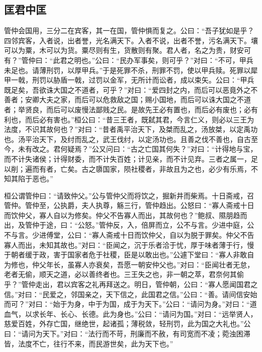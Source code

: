 \documentclass[]{article}
\begin{document}
\hypertarget{header-n335}{%
\subsection{匡君中匡}\label{header-n335}}

管仲会国用，三分二在宾客，其一在国，管仲惧而复之。公曰：``吾子犹如是乎？四邻宾客，入者说，出者誉，光名满天下。入者不说，出者不誉，污名满天下。壤可以为粟，木可以为货。粟尽则有生，货散则有聚。君人者，名之为贵，财安可有？''管仲曰：``此君之明也。''公曰：``民办军事矣，则可乎？''对曰：``不可，甲兵未足也。请薄刑罚，以厚甲兵。''于是死罪不杀，刑罪不罚，使以甲兵赎。死罪以犀甲一戟，刑罚以胁盾一戟，过罚以金军，无所计而讼者，成以束矢。公曰：``甲兵既足矣，吾欲诛大国之不道者，可乎？''对曰：``爱四封之内，而后可以恶竟外之不善者；安卿大夫之家，而后可以危救敌之国；赐小国地，而后可以诛大国之不道者；举贤良，而后可以废慢法鄙贱之民。是故先王必有置也，而后必有废也；必有利也，而后必有害也。''桓公曰：``昔三王者，既弑其君，今言仁义，则必以三王为法度，不识其故何也？''对曰：``昔者禹平治天下，及桀而乱之，汤放桀，以定禹功也。汤平治天下，及纣而乱之，武王伐纣，以定汤功也。且善之伐不善也，自古至今，未有改之。君何疑焉？''公又问曰：``古之亡国其何失？''对曰：``计得地与宝，而不计失诸侯；计得财委，而不计失百姓；计见亲，而不计见弃。三者之属一，足以削；遍而有者，亡矣。古之隳国家，陨社稷者，非故且为之也，必少有乐焉，不知其陷于恶也。''

桓公谓管仲曰：``请致仲父。''公与管仲父而将饮之，掘新井而柴焉。十日斋戒，召管仲。管仲至，公执爵，夫人执尊，觞三行，管仲趋出。公怒曰：``寡人斋戒十日而饮仲父，寡人自以为修矣。仲父不告寡人而出，其故何也？''鲍叔、隰朋趋而出，及管仲于途，曰：``公怒。''管仲反，入，倍屏而立，公不与言。少进中庭，公不与言。少进傅堂，公曰：``寡人斋戒十日而饮仲父，自以为脱于罪矣。仲父不告寡人而出，未知其故也。''对曰：``臣闻之，沉于乐者洽于忧，厚于味者薄于行，慢于朝者缓于政，害于国家者危于社稷，臣是以敢出也。''公遽下堂曰：``寡人非敢自为修也，仲父年长，虽寡人亦衰矣，吾愿一朝安仲父也。''对曰：``臣闻壮者无怠，老者无偷，顺天之道，必以善终者也。三王失之也，非一朝之萃，君奈何其偷乎？''管仲走出，君以宾客之礼再拜送之。明日，管仲朝，公曰：``寡人愿闻国君之信。''对曰：``民爱之，邻国亲之，天下信之，此国君之信。''公曰：``善。请间信安始而可？''对曰：``始于为身，中于为国，成于为天下。''公曰：``请问为身。''对曰：``道血气，以求长年、长心、长德。此为身也。''公曰：``请问为国。''对曰：``远举贤人，慈爱百姓，外存亡国，继绝世，起诸孤；薄税敛，轻刑罚，此为国之大礼也。''公曰：``请问为天下。''对曰：``法行而不苛，刑廉而不赦，有司宽而不凌；菀浊困滞皆，法度不亡，往行不来，而民游世矣，此为天下也。''
\end{document}
